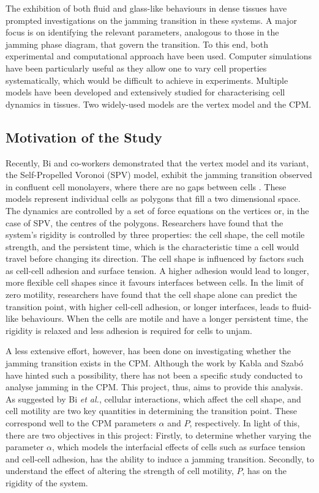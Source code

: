 \documentclass[a4paper,12pt]{article}
\begin{document}
The exhibition of both fluid and glass-like behaviours in dense tissues have prompted investigations on the jamming transition in these systems. A major focus is on identifying the relevant parameters, analogous to those in the jamming phase diagram, that govern the transition. To this end, both experimental and computational approach have been used. Computer simulations have been particularly useful as they allow one to vary cell properties systematically, which would be difficult to achieve in experiments. Multiple models have been developed and extensively studied for characterising cell dynamics in tissues. Two widely-used models are the vertex model and the CPM.  

\subsection{Motivation of the Study}
Recently, Bi and co-workers demonstrated that the vertex model and its variant, the Self-Propelled Voronoi (SPV) model, exhibit the jamming transition observed in confluent cell monolayers, where there are no gaps between cells \cite{bi2015density, bi2015motility}. These models represent individual cells as polygons that fill a two dimensional space. The dynamics are controlled by a set of force equations on the vertices or, in the case of SPV, the centres of the polygons. Researchers have found that the system's rigidity is controlled by three properties: the cell shape, the cell motile strength, and the persistent time, which is the characteristic time a cell would travel before changing its direction. The cell shape is influenced by factors such as cell-cell adhesion and surface tension. A higher adhesion would lead to longer, more flexible cell shapes since it favours interfaces between cells. In the limit of zero motility, researchers have found that the cell shape alone can predict the transition point, with higher cell-cell adhesion, or longer interfaces, leads to fluid-like behaviours. When the cells are motile and have a longer persistent time, the rigidity is relaxed and less adhesion is required for cells to unjam.

A less extensive effort, however, has been done on investigating whether the jamming transition exists in the CPM. Although the work by Kabla \cite{kabla2012} and Szab\'o \cite{szabo2010} have hinted such a possibility, there has not been a specific study conducted to analyse jamming in the CPM.  This project, thus, aims to provide this analysis. As suggested by Bi \emph{et al.}, cellular interactions, which affect the cell shape, and cell motility are two key quantities in determining the transition point. These correspond well to the CPM parameters $\alpha$ and $P$, respectively. In light of this, there are two objectives in this project: Firstly, to determine whether varying the parameter $\alpha$, which models the interfacial effects of cells such as surface tension and cell-cell adhesion, has the ability to induce a jamming transition. Secondly, to understand the effect of altering the strength of cell motility, $P$, has on the rigidity of the system.
\end{document}
